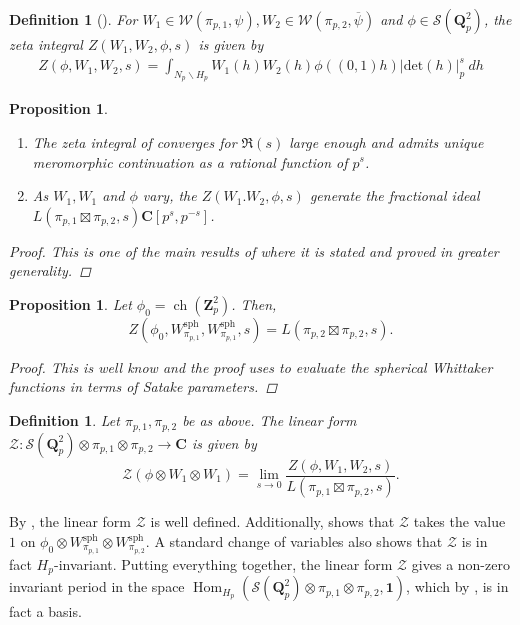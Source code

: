 \documentclass{amsart}%
\theoremstyle{plain}
\newtheorem{prop}[thm]{Proposition}
\theoremstyle{plain}
\newtheorem{defn}[thm]{Definition}
\theoremstyle{remark}
\DeclareMathOperator{\ch}{ch}
\DeclareMathOperator{\Hom}{Hom}
\begin{document}
\begin{defn}[\cite{jacquet1983rankin}]\label{def zeta integral}
    For $W_1\in\mathcal{W}(\pi_{p,1},\psi), W_2\in\mathcal{W}(\pi_{p,2},\overline{\psi})$ and $\phi\in\mathcal{S}(\mathbf{Q}_p^2)$, the zeta integral $Z(W_1,W_2,\phi,s)$ is given by
    \begin{align}
        Z(\phi,W_1,W_2,s)=\int_{N_p\backslash H_p}W_1(h)W_2(h)\phi((0,1)h)|\mathrm{det}(h)|_p^s\ dh
    \end{align}
\end{defn}
\begin{prop}\label{prop convergence}
    \begin{enumerate}
        \item The zeta integral of \emph{} converges for $\Re(s)$ large enough and admits unique meromorphic continuation as a rational function of $p^s$.
        \item As $W_1,W_1$ and $\phi$ vary, the $Z(W_1.W_2,\phi,s)$ generate the fractional ideal $L(\pi_{p,1}\boxtimes \pi_{p,2},s)\mathbf{C}[p^s,p^{-s}]$.
        
        \end{enumerate}
        \begin{proof}
            This is one of the main results of \cite{jacquet1983rankin} where it is stated and proved in greater generality.
        \end{proof}
\end{prop}
\begin{prop}\label{prop ev at spherical vector}
    Let $\phi_0=\ch(\mathbf{Z}_p^2)$. Then, 
    $$Z(\phi_0,W_{\pi_{p,1}}^\mathrm{sph},W_{\pi_{p,1}}^\mathrm{sph},s)=L(\pi_{p,2}\boxtimes\pi_{p,2},s).$$
    \begin{proof}
        This is well know and the proof uses \cite{shintani1976explicit} to evaluate the spherical Whittaker functions in terms of Satake parameters.
    \end{proof}
\end{prop}
\begin{defn}\label{def linear form} Let $\pi_{p,1}, \pi_{p,2}$ be as above. 
    The linear form $\mathcal{Z}:\mathcal{S}(\mathbf{Q}_p^2)\otimes \pi_{p,1}\otimes \pi_{p,2} \rightarrow\mathbf{C}$ is given by
    $$\mathcal{Z}(\phi\otimes W_1\otimes W_1)=\lim_{s\rightarrow 0}\frac{Z(\phi,W_1,W_2,s)}{L(\pi_{p,1}\boxtimes \pi_{p,2},s)}.$$
\end{defn}
\noindent By , the linear form $\mathcal{Z}$ is well defined. Additionally,  shows that $\mathcal{Z}$ takes the value $1$ on $\phi_0\otimes W_{\pi_{p,1}}^\mathrm{sph}\otimes W_{\pi_{p,2}}^\mathrm{sph}$. A standard change of variables also shows that $\mathcal{Z}$ is in fact $H_p$-invariant. Putting everything together, the linear form $\mathcal{Z}$ gives a non-zero invariant period in the space $\Hom_{H_p}(\mathcal{S}(\mathbf{Q}_p^2)\otimes \pi_{p,1}\otimes \pi_{p,2},\mathbf{1})$, which by , is in fact a basis.
\end{document}
